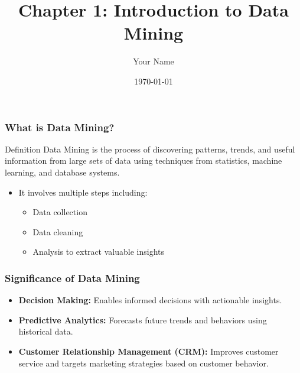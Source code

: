 \documentclass{beamer}
\title{Chapter 1: Introduction to Data Mining}
\author{Your Name}
\institute{Your Institution}
\date{\today}
\begin{document}
\frame{\titlepage}

\begin{frame}[fragile]
    \titlepage
\end{frame}

\begin{frame}[fragile]
    \frametitle{What is Data Mining?}
    \begin{block}{Definition}
        Data Mining is the process of discovering patterns, trends, and useful information from large sets of data using techniques from statistics, machine learning, and database systems.
    \end{block}
    \begin{itemize}
        \item It involves multiple steps including:
            \begin{itemize}
                \item Data collection
                \item Data cleaning
                \item Analysis to extract valuable insights
            \end{itemize}
    \end{itemize}
\end{frame}

\begin{frame}[fragile]
    \frametitle{Significance of Data Mining}
    \begin{itemize}
        \item \textbf{Decision Making:} Enables informed decisions with actionable insights.
        \item \textbf{Predictive Analytics:} Forecasts future trends and behaviors using historical data.
        \item \textbf{Customer Relationship Management (CRM):} Improves customer service and targets marketing strategies based on customer behavior.
    \end{itemize}
\end{frame}
\end{document}
